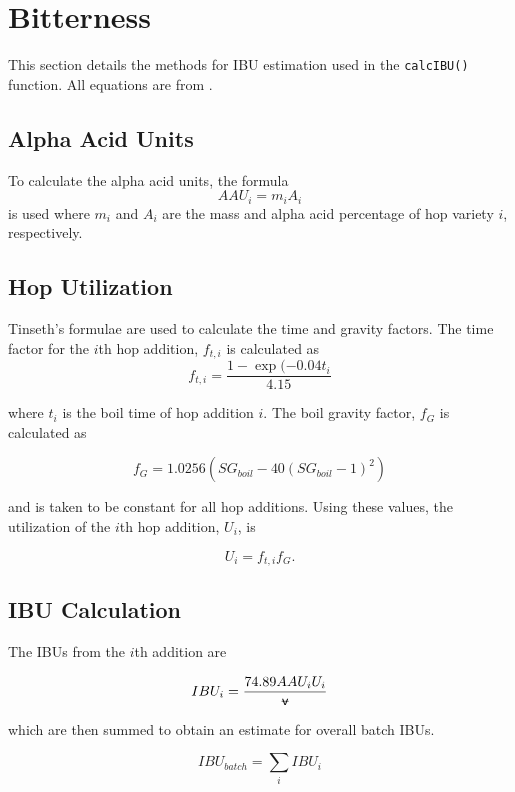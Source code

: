 \documentclass[../main.tex]{subfiles}
\begin{document}
\section{Bitterness}
    This section details the methods for IBU estimation used in the \texttt{calcIBU()} function. All equations are from \cite{Palmer}.
    
    \subsection{Alpha Acid Units}
        To calculate the alpha acid units, the formula    
        \begin{equation}
            AAU_{i} = m_{i}A_{i}
        \end{equation}
        is used where $m_{i}$ and $A_{i}$ are the mass and alpha acid percentage of hop variety $i$, respectively.
    
    \subsection{Hop Utilization}
        Tinseth's formulae are used to calculate the time and gravity factors. The time factor for the $i$th hop addition, $f_{t,i}$ is calculated as
        \begin{equation}
            f_{t,i} = \frac{1-\exp(-0.04t_{i}}{4.15}
        \end{equation}
        
        where $t_{i}$ is the boil time of hop addition $i$. The boil gravity factor, $f_{G}$ is calculated as
        
        \begin{equation}
            f_{G} = 1.0256 \left( SG_{boil} - 40 (SG_{boil} - 1)^{2} \right)
        \end{equation}
        
        and is taken to be constant for all hop additions. Using these values, the utilization of the $i$th hop addition, $U_{i}$, is
        
        \begin{equation}
            U_{i} = f_{t,i}f_{G}.
        \end{equation}
    
    \subsection{IBU Calculation}
        The IBUs from the $i$th addition are
        
        \begin{equation}
            IBU_{i} = \frac{74.89 AAU_{i} U_{i}}{\vol}
        \end{equation}
        
        which are then summed to obtain an estimate for overall batch IBUs.
        
        \begin{equation}
            IBU_{batch} = \sum_{i} IBU_{i}
        \end{equation}
\end{document}
